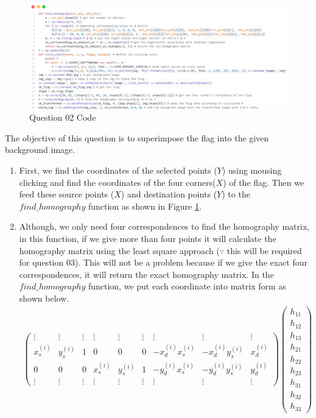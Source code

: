 \documentclass[a4paper]{article}
\begin{document}
\begin{figure}[!htb]
  \centering
  \includegraphics[width=\textwidth]{images/q2code.png}
  \caption{Question 02 Code}
  \label{q2code}
\end{figure}
The objective of this question is to superimpose the flag into the given background image.
\begin{enumerate}
  \itemsep0em 
  \item First, we find the coordinates of the selected points ($Y$) using
   mousing clicking and find the coordinates of the four corners($X$) of
    the flag. Then we feed these source points ($X$) and destination points
     ($Y$) to the $find\_homography$ function as shown in Figure \ref{q2code}.
  \item Although, we only need four correspondences to find the
   homography matrix, in this function, if we give more than four
    points it will calculate the homography matrix using the least
     square approach  ($\because$ this will be required for question 03). This
      will not be a problem because if we give the exact four
       correspondences, it will return the exact homography matrix.
        In the $find\_homography$ function,
   we put each coordinate into matrix form as shown below.
   \begin{align*}
     \begin{pmatrix}
       \vdots & \vdots & \vdots & \vdots & \vdots & \vdots & \vdots & \vdots & \vdots\\
       x_s^{(i)} & y_s^{(i)} & 1 & 0 & 0 & 0 &-x_d^{(i)}x_s^{(i)} &-x_d^{(i)}y_s^{(i)} & x_d^{(i)}\\
       0 & 0 & 0 & x_s^{(i)} & y_s^{(i)} & 1 & -y_d^{(i)}x_s^{(i)} &-y_d^{(i)}y_s^{(i)} & y_d^{(i)}\\
       \vdots & \vdots & \vdots & \vdots & \vdots & \vdots & \vdots & \vdots & \vdots
     \end{pmatrix}
     \begin{pmatrix}
       h_{11} \\ h_{12} \\h_{13} \\ h_{21} \\ h_{22} \\ h_{23} \\ h_{31} \\ h_{32} \\ h_{33}

\end{pmatrix}
\end{align*}
\end{enumerate}
\end{document}
